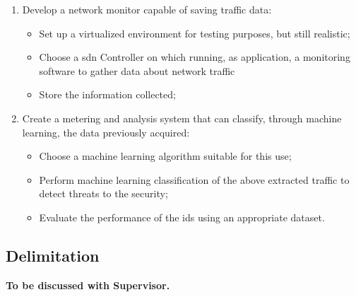 \begin{enumerate}
    \item Develop a network monitor capable of saving traffic data:
    \begin{itemize}
        \item[\faCaretRight] Set up a virtualized environment for testing purposes, but still realistic;
        \item[\faCaretRight] Choose a \gls{sdn} Controller on which running, as application, a monitoring software to gather data about network traffic
        \item[\faCaretRight] Store the information collected;
    \end{itemize}
    \item Create a metering and analysis system that can classify, through machine learning, the data previously acquired:
    \begin{itemize}
        \item[\faCaretRight] Choose a machine learning algorithm suitable for this use;
        \item[\faCaretRight] Perform machine learning classification of the above extracted traffic to detect threats to the security;
        \item[\faCaretRight] Evaluate the performance of the \gls{ids} using an appropriate dataset.
    \end{itemize}
\end{enumerate}


\subsection{Delimitation}
\label{subsec:delimitation}

\faEdit \quad \textbf{To be discussed with Supervisor.} \\

\textcolor{dimgray}{\lipsum[1-2]}

